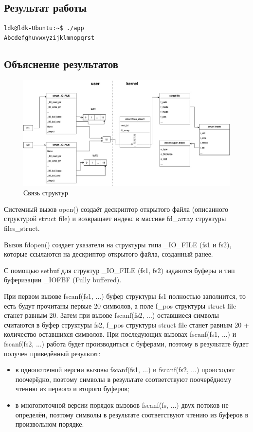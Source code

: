 \documentclass[12pt]{report}
\begin{document}
\subsection*{Результат работы}
\begin{lstlisting}
ldk@ldk-Ubuntu:~$ ./app
Abcdefghuvwxyzijklmnopqrst
\end{lstlisting}

\subsection*{Объяснение результатов}
\begin{figure}[H]
	\centering
	\includegraphics[scale=0.45]{os_lab_05-1.jpg}
	\caption{Связь структур}
	\label{fig:1}
\end{figure}
Системный вызов open() создаёт дескриптор открытого файла (описанного структурой struct file) и возвращает индекс в массиве fd\_array структуры files\_struct.

Вызов fdopen() создает указатели на структуры типа \_IO\_FILE (fs1 и fs2), которые ссылаются на дескриптор открытого файла, созданный ранее.

С помощью setbuf для структур \_IO\_FILE (fs1, fs2) задаются буферы и тип буферизации \_IOFBF (Fully buffered).

При первом вызове fscanf(fs1, ...) буфер структуры fs1 полностью заполнится, то есть будут прочитаны первые 20 символов, а поле f\_pos структуры struct file станет равным 20. Затем при вызове fscanf(fs2, ...) оставшиеся символы считаются в буфер структуры fs2, f\_pos структуры struct file станет равным 20 + количество оставшихся символов. При последующих вызовах fscanf(fs1, ...) и fscanf(fs2, ...) работа будет производиться с буферами, поэтому в результате будет получен приведённый результат:
\begin{itemize}
    \item в однопоточной версии вызовы fscanf(fs1, ...) и fscanf(fs2, ...) происходят поочерёдно, поэтому символы в результате соответствуют поочерёдному чтению из первого и второго буферов;
    \item в многопоточной версии порядок вызовов fscanf(fs, ...) двух потоков не определён, поэтому символы в результате соответствуют чтению из буферов в произвольном порядке.
\end{itemize}
\end{document}
